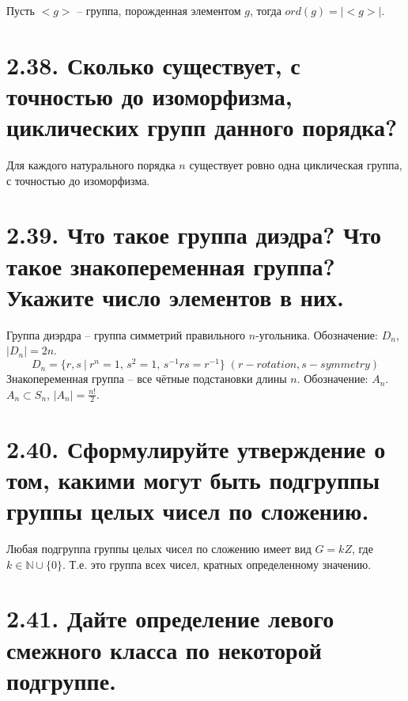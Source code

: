 \documentclass{article}
\begin{document}
Пусть $<g>$ -- группа, порожденная элементом $g$, тогда $ord(g) = |<g>|$.

\section*{\LARGE 2.38. Сколько существует, с точностью до изоморфизма, циклических групп данного порядка? }

Для каждого натурального порядка $n$ существует ровно одна циклическая группа, с точностью до изоморфизма.

\section*{\LARGE 2.39. Что такое группа диэдра? Что такое знакопеременная группа? Укажите число элементов в них. }

Группа диэрдра -- группа симметрий правильного $n$-угольника. Обозначение: $D_n$, $|D_n| = 2n$.
$$ D_n = \{r, s \:|\: r^n = 1,\, s^2 = 1,\, s^{-1}rs = r^{-1}\} \; (r - rotation, s - symmetry)$$
\newline Знакопеременная группа -- все чётные подстановки длины $n$. Обозначение: $A_n$. $A_n \subset S_n$, $|A_n| = \frac{n!}{2}$.

\section*{\LARGE 2.40. Сформулируйте утверждение о том, какими могут быть подгруппы группы целых чисел по сложению.  }

Любая подгруппа группы целых чисел по сложению имеет вид $G = kZ$, где $k \in \mathbb{N}\cup\{0\}$. Т.е. это группа всех чисел, кратных определенному значению.

\section*{\LARGE 2.41. Дайте определение левого смежного класса по некоторой подгруппе. }
\end{document}
